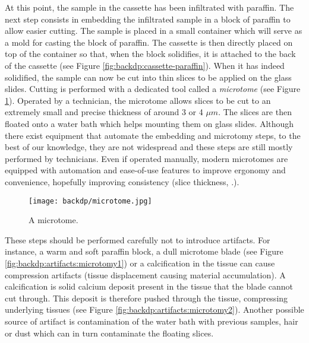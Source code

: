 At this point, the sample in the cassette has been infiltrated with paraffin. The next step consists in embedding the infiltrated sample in a block of paraffin to allow easier cutting. The sample is placed in a small container which will serve as a mold for casting the block of paraffin. The cassette is then directly placed on top of the container so that, when the block solidifies, it is attached to the back of the cassette (see Figure \ref{fig:backdp:cassette-paraffin}). When it has indeed solidified, the sample can now be cut into thin slices to be applied on the glass slides. Cutting is performed with a dedicated tool called a \textit{microtome} (see Figure \ref{fig:backdp:microtome}). Operated by a technician, the microtome allows slices to be cut to an extremely small and precise thickness of around 3 or 4 $\mu m$. The slices are then floated onto a water bath which helps mounting them on glass slides. Although there exist equipment that automate the embedding and microtomy steps, to the best of our knowledge, they are not widespread and these steps are still mostly performed by technicians. Even if operated manually, modern microtomes are equipped with automation and ease-of-use features to improve ergonomy and convenience, hopefully improving consistency (\ie slice thickness, \etc.).

\begin{figure}
  \centering
  \texttt{[image: backdp/microtome.jpg]}
  \caption{A microtome.}
  \label{fig:backdp:microtome}
\end{figure}

These steps should be performed carefully not to introduce artifacts. For instance, a warm and soft paraffin block, a dull microtome blade (see Figure \ref{fig:backdp:artifacts:microtomy1}) or a calcification in the tissue can cause compression artifacts (\ie tissue displacement causing material accumulation). A calcification is solid calcium deposit present in the tissue that the blade cannot cut through. This deposit is therefore pushed through the tissue, compressing underlying tissues (see Figure \ref{fig:backdp:artifacts:microtomy2}). Another possible source of artifact is contamination of the water bath with previous samples, hair or dust which can in turn contaminate the floating slices.   

